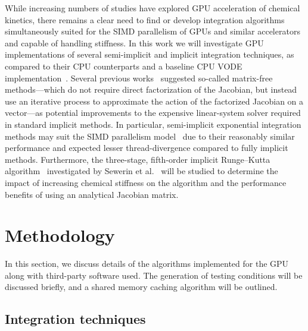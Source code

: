 \documentclass[preprint]{elsarticle}
\begin{document}
While increasing numbers of studies have explored GPU acceleration of chemical kinetics, there remains a clear need to find or develop integration algorithms simultaneously suited for the SIMD parallelism of GPUs and similar accelerators and capable of handling stiffness.
In this work we will investigate GPU implementations of several semi-implicit and implicit integration techniques, as compared to their CPU counterparts and a baseline CPU VODE implementation~\cite{Hindmarsh:2005hg}.
Several previous works~\cite{Stone:2013aa,Bisetti:2012jw,Niemeyer:2014aa,Perini20141180,McNenly2015581} suggested so-called matrix-free methods---which do not require direct factorization of the Jacobian, but instead use an iterative process to approximate the action of the factorized Jacobian on a vector---as potential improvements to the expensive linear-system solver required in standard implicit methods.
In particular, semi-implicit exponential integration methods may suit the SIMD parallelism model~\cite{Stone:2013aa,Bisetti:2012jw,Niemeyer:2014aa} due to their reasonably similar performance and expected lesser thread-divergence compared to fully implicit methods.
Furthermore, the three-stage, fifth-order implicit Runge--Kutta algorithm~\cite{wanner1991solving} investigated by Sewerin et al.~\cite{Sewerin20151375} will be studied to determine the impact of increasing chemical stiffness on the algorithm and the performance benefits of using an analytical Jacobian matrix.

\section{Methodology}
\label{sec:Method}

In this section, we discuss details of the algorithms implemented for the GPU along with third-party software used.
The generation of testing conditions will be discussed briefly, and a shared memory caching algorithm will be outlined.

\subsection{Integration techniques}
\end{document}
